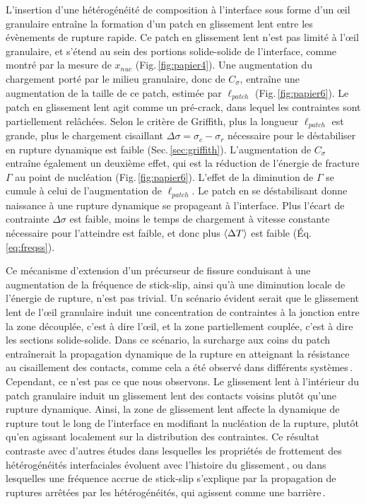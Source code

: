 \newpage

L'insertion d'une hétérogénéité de composition à l'interface sous forme d'un œil granulaire entraîne la formation d'un patch en glissement lent entre les évènements de rupture rapide. Ce patch en glissement lent n'est pas limité à l'œil granulaire, et s'étend au sein des portions solide-solide de l'interface, comme montré par la mesure de $x_{nuc}$ (Fig.\,\ref{fig:papier4}). Une augmentation du chargement porté par le milieu granulaire, donc de $C_\sigma$, entraîne une augmentation de la taille de ce patch, estimée par $\ell_{patch}$ (Fig.\,\ref{fig:papier6}).  Le patch en glissement lent agit comme un pré-crack, dans lequel les contraintes sont partiellement relâchées. Selon le critère de Griffith, plus la longueur $\ell_{patch}$ est grande, plus le chargement cisaillant $\Delta\sigma = \sigma_c-\sigma_r$ nécessaire pour le déstabiliser en rupture dynamique est faible (Sec.\,\ref{sec:griffith}). L'augmentation de $C_\sigma$ entraîne également un deuxième effet, qui est la réduction de l'énergie de fracture $\Gamma $ au point de nucléation (Fig.\,\ref{fig:papier6}). L'effet de la diminution de $\Gamma $ se cumule à celui de l'augmentation de $\ell_{patch}$. Le patch en se déstabilisant donne naissance à une rupture dynamique se propageant à l'interface. Plus l'écart de contrainte $\Delta\sigma$ est faible, moins le temps de chargement à vitesse constante nécessaire pour l'atteindre est faible, et donc plus $\left\langle {\Delta T} \right\rangle$ est faible (Éq.\,\ref{eq:freqss}).


Ce mécanisme d'extension d'un précurseur de fissure conduisant à une augmentation de la fréquence de stick-slip, ainsi qu'à une diminution locale de l'énergie de rupture, n'est pas trivial. Un scénario évident serait que le glissement lent de l'œil granulaire induit une concentration de contraintes à la jonction entre la zone découplée, c'est à dire l'œil, et la zone partiellement couplée, c'est à dire les sections solide-solide. Dans ce scénario, la surcharge aux coins du patch entraînerait la propagation dynamique de la rupture en atteignant la résistance au cisaillement des contacts, comme cela a été observé dans différents systèmes\,\cite{bedford_fault_2022,gvirtzman_nucleation_2021}. Cependant, ce n'est pas ce que nous observons. Le glissement lent à l'intérieur du patch granulaire induit un glissement lent des contacts voisins plutôt qu'une rupture dynamique. Ainsi, la zone de glissement lent affecte la dynamique de rupture tout le long de l'interface en modifiant la nucléation de la rupture, plutôt qu'en agissant localement sur la distribution des contraintes. Ce résultat contraste avec d'autres études dans lesquelles les propriétés de frottement des hétérogénéités interfaciales évoluent avec l'histoire du glissement\,\cite{cebry_creep_2022,bedford_fault_2022,rubino_intermittent_2022}, ou dans lesquelles une fréquence accrue de stick-slip s'explique par la propagation de ruptures arrêtées par les hétérogénéités, qui agissent comme une barrière\,\cite{bayart_rupture_2018,buijze_effects_2021,ma_period_2001}. 




